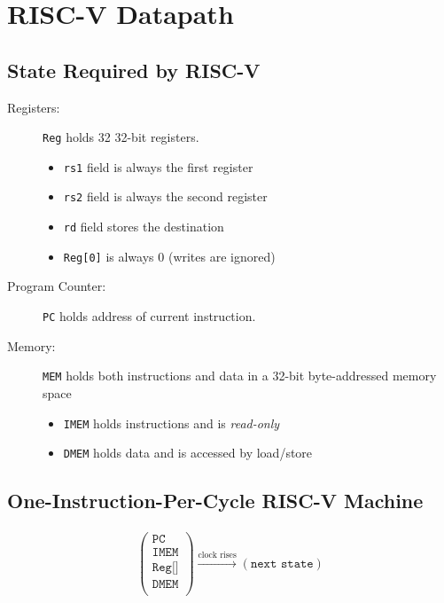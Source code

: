 \chapter{RISC-V Datapath}

\section{State Required by RISC-V}
\begin{description}
	\item[Registers:] \texttt{Reg} holds 32 32-bit registers.
	
	\begin{itemize}
	    \item \texttt{rs1} field is always the first register
	    \item \texttt{rs2} field is always the second register
	    \item \texttt{rd} field stores the destination
	    \item \texttt{Reg[0]} is always 0 (writes are ignored)
	\end{itemize}

	\item[Program Counter:] \texttt{PC} holds address of current instruction.
	
	\item[Memory:] \texttt{MEM} holds both instructions and data in a 32-bit byte-addressed memory space
    
    \begin{itemize}
        \item \texttt{IMEM} holds instructions and is \emph{read-only}
        \item \texttt{DMEM} holds data and is accessed by load/store
    \end{itemize}
\end{description}

\section{One-Instruction-Per-Cycle RISC-V Machine}
\begin{align*}
\begin{pmatrix}
\texttt{PC} \\
\texttt{IMEM} \\
\texttt{Reg[]}\\ 
\texttt{DMEM}\\
\end{pmatrix}
\xrightarrow{\text{clock rises}}{}
\left(\texttt{next state}\right)
\end{align*}

